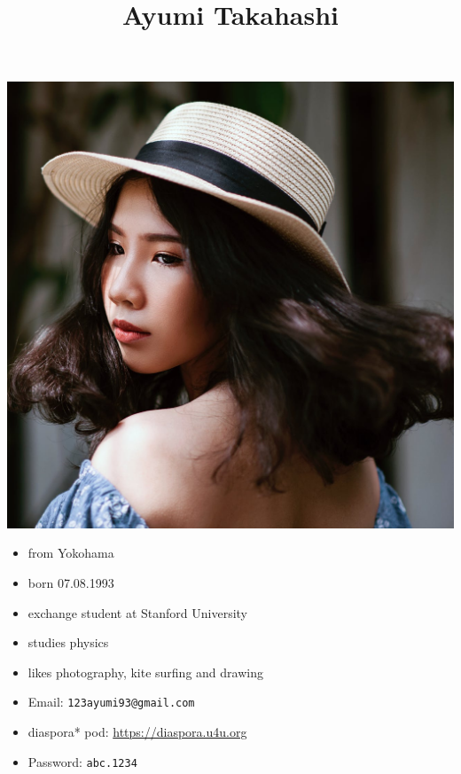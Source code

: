 \documentclass[a4paper,11pt]{scrartcl}
\date{}
\title{Ayumi Takahashi}
\begin{document}
\maketitle
\includegraphics[width=.9\linewidth]{AyumiTakahashi.jpg}

\clearpage

\begin{itemize}
\item from Yokohama
\item born 07.08.1993
\item exchange student at Stanford University
\item studies physics
\item likes photography, kite surfing and drawing
\item Email: \texttt{123ayumi93@gmail.com}
\item diaspora* pod: \url{https://diaspora.u4u.org}
\item Password: \texttt{abc.1234}
\end{itemize}
\end{document}
